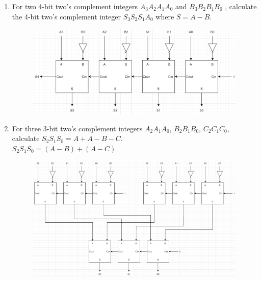 \documentclass{article}
\begin{document}
\begin{enumerate}[label=\alph*.]
    \item For two 4-bit two's complement integers $A_3A_2A_1A_0$ and $B_3B_2B_1B_0$ , calculate the 4-bit two's complement integer $S_3S_2S_1A_0$ where $S=A-B$. \\
    \begin{figure}[!h]
        \centering
        \includegraphics[width=1\textwidth]{figures/adder2b_solution.png}
    \end{figure}
    \newpage
    \item For three 3-bit two's complement integers $A_2A_1A_0$, $B_2B_1B_0$, $C_2C_1C_0$, calculate $S_2S_1S_0=A+A-B-C$. \\
    $S_2S_1S_0 = (A-B)+(A-C)$\\
    \begin{figure}[!h]
        \centering
        \includegraphics[width=1\textwidth]{figures/adder2c_solution.png}
    \end{figure}
\end{enumerate}

\newpage
\end{document}
